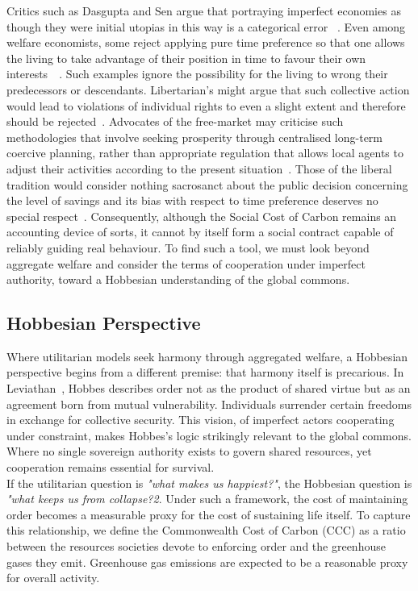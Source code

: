 \documentclass[12pt, oneside]{article}   	%
\begin{document}
Critics such as Dasgupta and Sen argue that portraying imperfect economies as though they were initial utopias in this way is a categorical error ~\cite{as1}.
Even among welfare economists, some reject applying pure time preference so that one allows the living to take advantage of their position in time to favour their own interests~\cite{hs1}~\cite{fr1}.
Such examples ignore the possibility for the living to wrong their predecessors or descendants.
Libertarian's might argue that such collective action would lead to violations of individual rights to even a slight extent and therefore should be rejected~\cite{rn1}.
Advocates of the free-market may criticise such methodologies that involve seeking prosperity through centralised long-term coercive planning, rather than appropriate regulation that allows local agents to adjust their activities according to the present situation~\cite{fh1}.
Those of the liberal tradition would consider nothing sacrosanct about the public decision concerning the level of savings and its bias with respect to time preference deserves no special respect~\cite{jr1}.
Consequently, although the Social Cost of Carbon remains an accounting device of sorts, it cannot by itself form a social contract capable of reliably guiding real behaviour.
To find such a tool, we must look beyond aggregate welfare and consider the terms of cooperation under imperfect authority, toward a Hobbesian understanding of the global commons.\\

\subsection{Hobbesian Perspective}

Where utilitarian models seek harmony through aggregated welfare, a Hobbesian perspective begins from a different premise: that harmony itself is precarious.
In Leviathan~\cite{th1}, Hobbes describes order not as the product of shared virtue but as an agreement born from mutual vulnerability.
Individuals surrender certain freedoms in exchange for collective security.
This vision, of imperfect actors cooperating under constraint, makes Hobbes’s logic strikingly relevant to the global commons.
Where no single sovereign authority exists to govern shared resources, yet cooperation remains essential for survival.\\

If the utilitarian question is \emph{"what makes us happiest?"}, the Hobbesian question is \emph{"what keeps us from collapse?2}.
Under such a framework, the cost of maintaining order becomes a measurable proxy for the cost of sustaining life itself.
To capture this relationship, we define the Commonwealth Cost of Carbon (CCC) as a ratio between the resources societies devote to enforcing order and the greenhouse gases they emit.
Greenhouse gas emissions are expected to be a reasonable proxy for overall activity.\\
\end{document}
